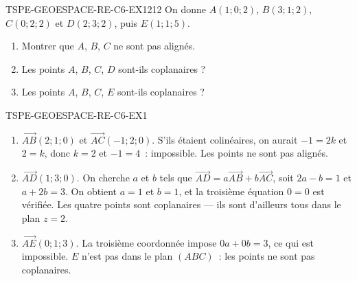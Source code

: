 
\begin{exercice}{TSPE-GEOESPACE-RE-C6-EX1}{2}{12}
On donne $A(1;0;2)$, $B(3;1;2)$, $C(0;2;2)$ et $D(2;3;2)$, puis $E(1;1;5)$.
\begin{enumerate}
  \item Montrer que $A$, $B$, $C$ ne sont pas alignés.
  \item Les points $A$, $B$, $C$, $D$ sont-ils coplanaires ?
  \item Les points $A$, $B$, $C$, $E$ sont-ils coplanaires ?
\end{enumerate}
\end{exercice}


\begin{corrige}{TSPE-GEOESPACE-RE-C6-EX1}
\begin{enumerate}
  \item $\vec{AB}(2;1;0)$ et $\vec{AC}(-1;2;0)$. S'ils étaient colinéaires, on
        aurait $-1=2k$ et $2=k$, donc $k=2$ et $-1=4$~: impossible. Les points
        ne sont pas alignés.
  \item $\vec{AD}(1;3;0)$. On cherche $a$ et $b$ tels que
        $\vec{AD}=a\vec{AB}+b\vec{AC}$, soit $2a-b=1$ et $a+2b=3$. On obtient
        $a=1$ et $b=1$, et la troisième équation $0=0$ est vérifiée. Les
        quatre points sont coplanaires --- ils sont d'ailleurs tous dans le
        plan $z=2$.
  \item $\vec{AE}(0;1;3)$. La troisième coordonnée impose $0a+0b=3$, ce qui
        est impossible. $E$ n'est pas dans le plan $(ABC)$~: les points ne
        sont pas coplanaires.
\end{enumerate}
\end{corrige}
